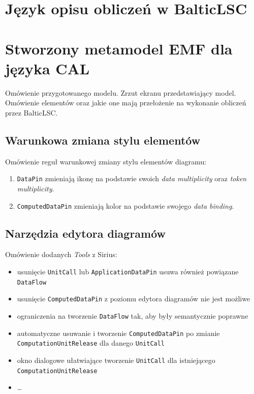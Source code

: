 \section{Język opisu obliczeń w BalticLSC}

\section{Stworzony metamodel EMF dla języka CAL}

Omówienie przygotowanego modelu. Zrzut ekranu przedstawiający model. Omówienie
elementów oraz jakie one mają przełożenie na wykonanie obliczeń przez
BalticLSC\@.

\subsection{Warunkowa zmiana stylu elementów}

Omówienie reguł warunkowej zmiany stylu elementów diagramu:

\begin{enumerate}
	\item \texttt{DataPin} zmieniają ikonę na podstawie swoich \textit{data
		      multiplicity} oraz \textit{token multiplicity}.
	\item \texttt{ComputedDataPin} zmieniają kolor na podstawie swojego
	      \textit{data binding}.
\end{enumerate}

\subsection{Narzędzia edytora diagramów}

Omówienie dodanych \textit{Tools} z Sirius:

\begin{itemize}
	\item usunięcie \texttt{UnitCall} lub \texttt{ApplicationDataPin} usuwa również powiązane \texttt{DataFlow}
	\item usunięcie \texttt{ComputedDataPin} z poziomu edytora diagramów nie jest możliwe
	\item ograniczenia na tworzenie \texttt{DataFlow} tak, aby były semantycznie poprawne
	\item automatyczne usuwanie i tworzenie \texttt{ComputedDataPin} po zmianie \texttt{ComputationUnitRelease} dla danego \texttt{UnitCall}
	\item okno dialogowe ułatwiające tworzenie \texttt{UnitCall} dla istniejącego \texttt{ComputationUnitRelease}
	\item \ldots
\end{itemize}

